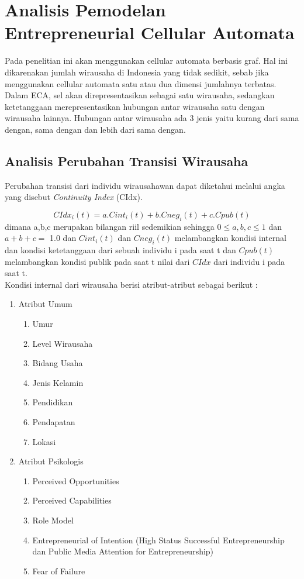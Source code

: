 \section{Analisis Pemodelan Entrepreneurial Cellular Automata}
\label{analisisCA}
Pada penelitian ini akan menggunakan cellular automata berbasis graf. Hal ini dikarenakan jumlah wirausaha di Indonesia yang tidak sedikit, sebab jika menggunakan cellular automata satu atau dua dimensi jumlahnya terbatas.\\
Dalam ECA, sel akan direpresentasikan sebagai satu wirausaha, sedangkan ketetanggaan merepresentasikan hubungan antar wirausaha satu dengan wirausaha lainnya. Hubungan antar wirausaha ada 3 jenis yaitu kurang dari sama dengan, sama dengan dan lebih dari sama dengan.

\subsection{Analisis Perubahan Transisi Wirausaha}
\label{analisistransisi}
Perubahan transisi dari individu wirausahawan dapat diketahui melalui angka yang disebut \textit{Continuity Index} (CIdx).

\begin{displaymath}
\label{RumusCIDx}
	CIdx_{i}(t) = a.Cint_{i}(t) + b.Cneg_{i}(t) + c.Cpub(t)
\end{displaymath}
dimana a,b,c merupakan bilangan riil sedemikian sehingga $0\leq a,b,c \leq 1$ dan $a+b+c=$ 1.0 dan $Cint_{i}(t)$ dan $Cneg_{i}(t)$ melambangkan kondisi internal dan kondisi ketetanggaan dari sebuah individu i pada saat t dan $Cpub(t)$ melambangkan kondisi publik pada saat t nilai dari $CIdx$ dari individu i pada saat t.\\
Kondisi internal dari wirausaha berisi atribut-atribut sebagai berikut :
\begin{enumerate}
	\item Atribut Umum
		\begin{enumerate}
			\item Umur
			\item Level Wirausaha
			\item Bidang Usaha
			\item Jenis Kelamin
			\item Pendidikan
			\item Pendapatan
			\item Lokasi
		\end{enumerate}
	\item Atribut Psikologis
		 \begin{enumerate}
			\item Perceived Opportunities
			\item Perceived Capabilities
			\item Role Model
			\item Entrepreneurial of Intention (High Status Successful Entrepreneurship dan Public Media Attention for Entrepreneurship)
			\item Fear of Failure
		 \end{enumerate}
		\end{enumerate}
		
